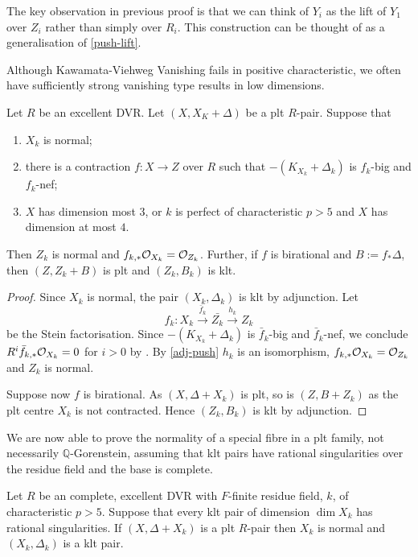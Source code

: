 \begin{remark}
	The key observation in previous proof is that we can think of $Y_{i}$ as the lift of $Y_{1}$ over $Z_{i}$ rather than simply over $R_{i}$. This construction can be thought of as a generalisation of \autoref{push-lift}.
\end{remark}

Although Kawamata-Viehweg Vanishing fails in positive characteristic, we often have sufficiently strong vanishing type results in low dimensions.

\begin{lemma}\label{invAdj2}
	Let $R$ be an excellent DVR.
	Let $(X,X_{K}+\Delta)$ be a plt $R$-pair. Suppose that
	\begin{enumerate}
		\item $X_k$ is normal;
		\item there is a contraction $f \colon X \to Z$ over $R$ such that $-(K_{X_{k}}+\Delta_{k})$ is $f_{k}$-big and $f_k$-nef;
		\item $X$ has dimension most $3$, or $k$ is perfect of characteristic $p>5$ and $X$ has dimension at most $4$.
	\end{enumerate}  
	Then $Z_{k}$ is normal and $f_{k,*}\ox[X_{k}]=\ox[Z_{k}]$. Further, if $f$ is birational and $B:=f_{*}\Delta$, then $(Z, Z_k+B)$ is plt and $(Z_{k},B_{k})$ is klt.
\end{lemma}

\begin{proof}
	Since $X_{k}$ is normal, the pair $(X_{k},\Delta_{k})$ is klt by adjunction. 
	Let $$f_{k}\colon X_{k} \xrightarrow{\bar{f}_{k}} \bar{Z_k} \xrightarrow{h_k} Z_{k}$$ be the Stein factorisation. 
	Since $-(K_{X_{k}}+\Delta_{k})$ is $\bar{f}_{k}$-big and $\bar{f}_{k}$-nef, we conclude $R^{i}\bar{f}_{k,*}\ox[X_{k}]=0$ for $i> 0$ by \cite[Proposition 3.2]{tanaka2018minimal}.
	By \autoref{adj-push} $h_k$ is an isomorphism, $f_{k,*}\ox[X_{k}]=\ox[Z_{k}]$ and $Z_{k}$ is normal.
	
	Suppose now $f$ is birational. As $(X,\Delta+X_k)$ is plt, so is $(Z,B+Z_k)$ as the plt centre $X_k$ is not contracted. Hence $(Z_k,B_k)$ is klt by adjunction.			
\end{proof}

We are now able to prove the normality of a special fibre in a plt family, not necessarily $\mathbb{Q}$-Gorenstein, assuming that klt pairs have rational singularities over the residue field and the base is complete.

\begin{theorem}\label{NormalToRational}
	Let $R$ be an complete, excellent DVR with $F$-finite residue field, $k$, of characteristic $p> 5$. Suppose that every klt pair of dimension $\dim X_{k}$ has rational singularities. If $(X,\Delta+X_{k})$ is a plt $R$-pair then $X_{k}$ is normal and $(X_{k}, \Delta_{k})$ is a klt pair.
\end{theorem}

